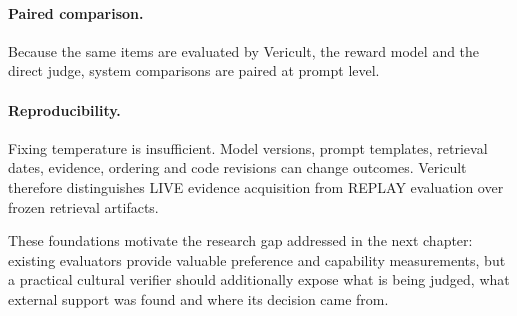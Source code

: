 \paragraph{Paired comparison.} Because the same items are evaluated by Vericult, the reward model and the direct judge, system comparisons are paired at prompt level.

\paragraph{Reproducibility.} Fixing temperature is insufficient. Model versions, prompt templates, retrieval dates, evidence, ordering and code revisions can change outcomes. Vericult therefore distinguishes LIVE evidence acquisition from REPLAY evaluation over frozen retrieval artifacts.

These foundations motivate the research gap addressed in the next chapter: existing evaluators provide valuable preference and capability measurements, but a practical cultural verifier should additionally expose what is being judged, what external support was found and where its decision came from.
